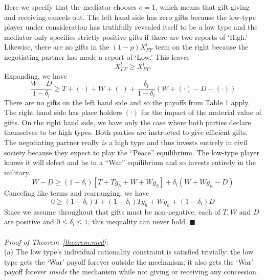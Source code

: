 \documentclass[12pt, letterpaper]{article}
\newcommand{\de}{\delta}
\newcommand{\al}{\alpha}
\begin{document}
{Here we specify that the mediator chooses $e=1$, which means that gift giving and receiving cancels out. The left hand side has zero gifts because the low-type player under consideration has truthfully revealed itself to be a low type and the mediator only specifies strictly positive gifts if there are two reports of `High.' Likewise, there are no gifts in the $(1-p)X_{FF}^l$ term on the right because the negotiating partner has made a report of `Low.' This leaves
		$$X_{FF}^l \geq X_{FT}^l.$$
		Expanding, we have
		\[
			\frac{W-D}{1-\de_l} \geq T + \left(\cdot \right) + W + \left(\cdot \right) + \frac{\de_l}{1-\de_l}\left(W+ \left(\cdot \right) -D - \left(\cdot \right) \right)
		\]
There are no gifts on the left hand side and so the payoffs from Table 1 apply. The right hand side has place holders $\left(\cdot\right)$ for the impact of the material value of gifts. On the right hand side, we have only the case where both parties declare themselves to be high types. Both parties are instructed to give efficient gifts. The negotiating partner really \emph{is} a high type and thus invests entirely in civil society because they expect to play the ``Peace'' equilibrium. The low-type player knows it will defect and be in a ``War'' equilibrium and so invests entirely in the military. 
		\begin{equation}
			W-D \geq 
			\left(1-\de_l\right) \left[T + Tg_h + W + Wg_h \right] + \de_l \left(W + Wg_h -D \right)
			\label{eq:med}
		\end{equation}
Canceling like terms and rearranging, we have
			\[
					0 \geq \left(1 - \de_l \right) T + \left(1 - \de_l \right) Tg_h + Wg_h + \left(1 - \de_l \right) D
			\]
			Since we assume throughout that gifts must be non-negative, each of $T, W$ and $D$ are positive and $0 \leq \de_l \leq 1$, this inequality can never hold.	\hfill $\blacksquare$\\
			\\
\emph{Proof of Theorem~\ref{theorem:med}:}\\
(a) The low type's individual rationality constraint is satisfied trivially: the low type gets the `War' payoff forever outside the mechanism; it also gets the `War' payoff forever \emph{inside} the mechanism while not giving or receiving any concession.

}
\end{document}
